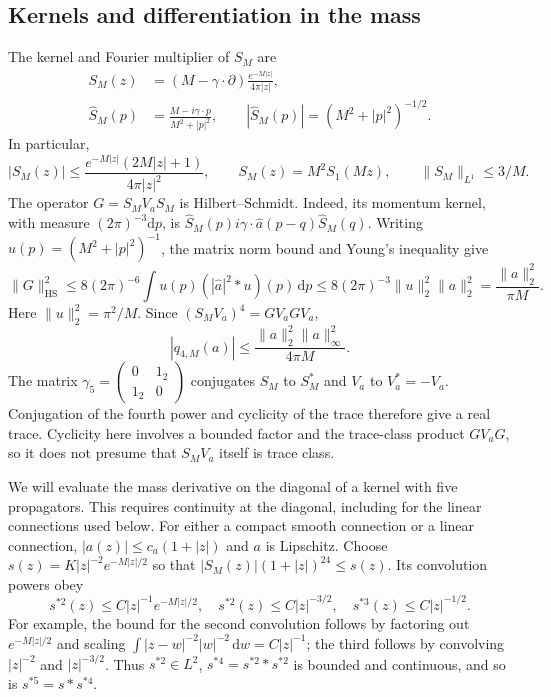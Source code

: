 \documentclass[11pt,letterpaper,reqno]{amsart}
\newcommand{\dd}{\mathrm d}
\begin{document}
\subsection{Kernels and differentiation in the mass}

The kernel and Fourier multiplier of $S_M$ are
\begin{align}
 S_M(z)&=(M-\gamma\cdot\partial)
              \frac{e^{-M|z|}}{4\pi|z|},\label{eq:probe-free-kernel}\\
 \widehat S_M(p)&=\frac{M-i\gamma\cdot p}{M^2+|p|^2},\qquad
 |\widehat S_M(p)|=(M^2+|p|^2)^{-1/2}.
 \label{eq:probe-free-symbol}
\end{align}
In particular,
\[
 |S_M(z)|\le\frac{e^{-M|z|}(2M|z|+1)}{4\pi|z|^2},\qquad
 S_M(z)=M^2S_1(Mz),\qquad \|S_M\|_{L^1}\le3/M.
\]
The operator $G=S_MV_aS_M$ is Hilbert--Schmidt. Indeed, its momentum
kernel, with measure $(2\pi)^{-3}\dd p$, is
$\widehat S_M(p)i\gamma\cdot\widehat a(p-q)\widehat S_M(q)$.
Writing $u(p)=(M^2+|p|^2)^{-1}$, the matrix norm bound and Young's
inequality give
\[
 \|G\|_{\mathrm{HS}}^2
 \le8(2\pi)^{-6}\int u(p)(|\widehat a|^2*u)(p)\,\dd p
 \le8(2\pi)^{-3}\|u\|_2^2\|a\|_2^2
 =\frac{\|a\|_2^2}{\pi M}.
\]
Here $\|u\|_2^2=\pi^2/M$. Since $(S_MV_a)^4=GV_aGV_a$,
\begin{equation}\label{eq:probe-trace-bound}
 |q_{4,M}(a)|\le\frac{\|a\|_2^2\|a\|_\infty^2}{4\pi M}.
\end{equation}
The matrix $\gamma_5=\left(\begin{smallmatrix}0&1_2\\1_2&0\end{smallmatrix}\right)$
conjugates $S_M$ to $S_M^*$ and $V_a$ to $V_a^*=-V_a$.
Conjugation of the fourth power and cyclicity of the trace therefore
give a real trace. Cyclicity here involves a bounded factor and the
trace-class product $GV_aG$, so it does not presume that $S_MV_a$
itself is trace class.

We will evaluate the mass derivative on the diagonal of a kernel with
five propagators. This requires continuity at the diagonal, including
for the linear connections used below. For either a compact smooth
connection or a linear connection, $|a(z)|\le c_a(1+|z|)$ and
$a$ is Lipschitz. Choose
$s(z)=K|z|^{-2}e^{-M|z|/2}$ so that
$|S_M(z)|(1+|z|)^{24}\le s(z)$. Its convolution powers obey
\begin{equation}\label{eq:probe-convolutions}
 s^{*2}(z)\le C|z|^{-1}e^{-M|z|/2},\quad
 s^{*2}(z)\le C|z|^{-3/2},\quad
 s^{*3}(z)\le C|z|^{-1/2}.
\end{equation}
For example, the bound for the second convolution follows by factoring
out $e^{-M|z|/2}$ and scaling
$\int|z-w|^{-2}|w|^{-2}\,\dd w=C|z|^{-1}$; the third follows by
convolving $|z|^{-2}$ and $|z|^{-3/2}$. Thus $s^{*2}\in L^2$,
$s^{*4}=s^{*2}*s^{*2}$ is bounded and continuous, and so is
$s^{*5}=s*s^{*4}$.
\end{document}
